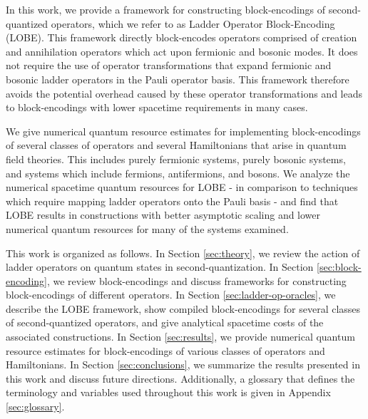 In this work, we provide a framework for constructing block-encodings of second-quantized operators, which we refer to as Ladder Operator Block-Encoding (LOBE).
This framework directly block-encodes operators comprised of creation and annihilation operators which act upon fermionic and bosonic modes.
It does not require the use of operator transformations that expand fermionic \cite{jordan1928paulische, bravyi2002fermionic, seeley2012bravyi} and bosonic \cite{somma2005quantum,standard-binary} ladder operators in the Pauli operator basis.
This framework therefore avoids the potential overhead caused by these operator transformations and leads to block-encodings with lower spacetime requirements in many cases.

We give numerical quantum resource estimates for implementing block-encodings of several classes of operators and several Hamiltonians that arise in quantum field theories.
This includes purely fermionic systems, purely bosonic systems, and systems which include fermions, antifermions, and bosons. 
We analyze the numerical spacetime quantum resources for LOBE - in comparison to techniques which require mapping ladder operators onto the Pauli basis - and find that LOBE results in constructions with better asymptotic scaling and lower numerical quantum resources for many of the systems examined.

This work is organized as follows.
In Section \ref{sec:theory}, we review the action of ladder operators on quantum states in second-quantization.
In Section \ref{sec:block-encoding}, we review block-encodings and discuss frameworks for constructing block-encodings of different operators.
In Section \ref{sec:ladder-op-oracles}, we describe the LOBE framework, show compiled block-encodings for several classes of second-quantized operators, and give analytical spacetime costs of the associated constructions.
In Section \ref{sec:results}, we provide numerical quantum resource estimates for block-encodings of various classes of operators and Hamiltonians.
In Section \ref{sec:conclusions}, we summarize the results presented in this work and discuss future directions.
Additionally, a glossary that defines the terminology and variables used throughout this work is given in Appendix \ref{sec:glossary}.

